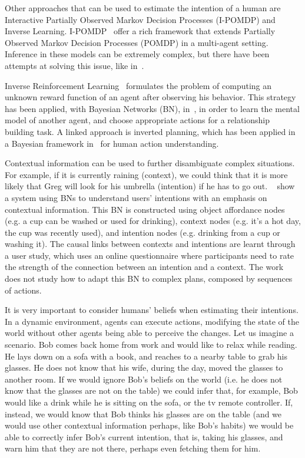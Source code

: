 Other approaches that can be used to estimate the intention of a human are Interactive Partially Observed Markov Decision Processes (I-POMDP) and Inverse Learning. I-POMDP~\citep{gmytrasiewicz2004interactive} offer a rich framework that extends Partially Observed Markov Decision Processes (POMDP) in a multi-agent setting. Inference in these models can be extremely complex, but there have been attempts at solving this issue, like in~\cite{doshi2009monte,hoang2013interactive}. 

Inverse Reinforcement Learning~\citep{ng2000algorithms} formulates the problem of computing an unknown reward function of an agent after observing his behavior. This strategy has been applied, with Bayesian Networks (BN), in~\cite{Nagai2015}, in order to learn the mental model of another agent, and choose appropriate actions for a relationship building task. A linked approach is inverted planning, which has been applied in a Bayesian framework in~\cite{baker2009action}  for human action understanding.

Contextual information can be used to further disambiguate complex situations. For example, if it is currently raining (context), we could think that it is more likely that Greg will look for his umbrella (intention) if he has to go out. ~\cite{Liu2014} show a system using BNs to understand users' intentions with an emphasis on contextual information. This BN is constructed using object affordance nodes (e.g. a cup can be washed or used for drinking), context nodes (e.g. it's a hot day, the cup was recently used), and intention nodes (e.g. drinking from a cup or washing it). The causal links between contexts and intentions are learnt through a user study, which uses an online questionnaire where participants need to rate the strength of the connection between an intention and a context. The work does not study how to adapt this BN to complex plans, composed by sequences of actions.

It is very important to consider humans' beliefs when estimating their intentions. In a dynamic environment, agents can execute actions, modifying the state of the world without other agents being able to perceive the changes. Let us imagine a scenario. Bob comes back home from work and would like to relax while reading. He lays down on a sofa with a book, and reaches to a nearby table to grab his glasses. He does not know that his wife, during the day, moved the glasses to another room. If we would ignore Bob's beliefs on the world (i.e. he does not know that the glasses are not on the table) we could infer that, for example, Bob would like a drink while he is sitting on the sofa, or the tv remote controller. If, instead, we would know that Bob thinks his glasses are on the table (and we would use other contextual information perhaps, like Bob's habits) we would be able to correctly infer Bob's current intention, that is, taking his glasses, and warn him that they are not there, perhaps even fetching them for him. 

